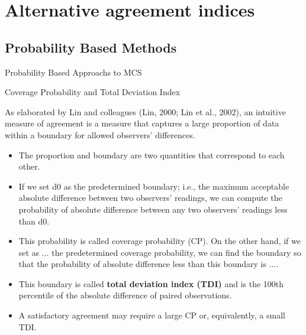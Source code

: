 \documentclass[12pt, a4paper]{report}
\theoremstyle{plain}
\theoremstyle{definition}
\theoremstyle{remark}
\begin{document}
	
	
	
	\chapter{Alternative agreement indices}
	
	\section{Probability Based Methods}
	Probability Based Approachs to MCS
	
	
	Coverage Probability and Total Deviation Index
	
	As elaborated by Lin and colleagues (Lin, 2000; Lin et al., 2002), an intuitive measure of
	agreement is a measure that captures a large proportion of data within a boundary for allowed
	observers’ differences. 
	
	
	\begin{itemize}
		\item The proportion and boundary are two quantities that correspond to
		each other. 
		\item If we set d0 as the predetermined boundary; i.e., the maximum acceptable
		absolute difference between two observers’ readings, we can compute the probability of absolute
		difference between any two observers’ readings less than d0. 
		
		\item This probability is called
		coverage probability (CP). On the other hand, if we set as $\ldots$ the predetermined coverage
		probability, we can find the boundary so that the probability of absolute difference less than
		this boundary is $\ldots$. 
		\item This boundary is called \textbf{total deviation index (TDI)} and is the 100th
		percentile of the absolute difference of paired observations. \item A satisfactory agreement may
		require a large CP or, equivalently, a small TDI.
		
	\end{itemize}
	
\end{document}

